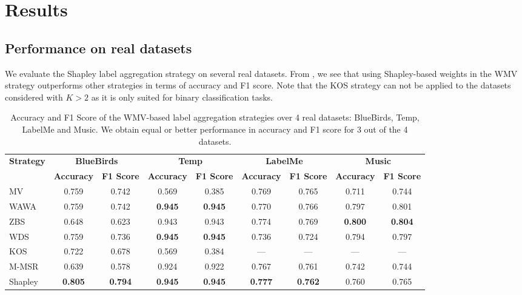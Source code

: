 \documentclass{cap2024}
\begin{document}
\section{Results}
\label{sec:results}
\subsection{Performance on real datasets}

We evaluate the Shapley label aggregation strategy on several real datasets.
From , we see that using Shapley-based weights in the WMV strategy outperforms other strategies in terms of accuracy and F1 score.
Note that the KOS strategy can not be applied to the datasets considered with $K>2$ as it is only suited for binary classification tasks.

\begin{table}[h]
  \centering
  \caption{Accuracy and F1 Score of the WMV-based label aggregation strategies over 4 real datasets: BlueBirds, Temp, LabelMe and Music. We obtain equal or better performance in accuracy and F1 score for 3 out of the 4 datasets.\\ }
  \label{tab:scores}

  \footnotesize{
  \begin{tabular}{l|cc|cc|cc|cc}
  \hline
  \multirow{2}{*}{\textbf{Strategy}} & \multicolumn{2}{c|}{\textbf{BlueBirds}} & \multicolumn{2}{c|}{\textbf{Temp}} & \multicolumn{2}{c|}{\textbf{LabelMe}} & \multicolumn{2}{c}{\textbf{Music}} \\
  \cline{2-9}
   & \textbf{Accuracy} & \textbf{F1 Score} & \textbf{Accuracy} & \textbf{F1 Score} & \textbf{Accuracy} & \textbf{F1 Score} & \textbf{Accuracy} & \textbf{F1 Score} \\
  \hline
  MV    & 0.759 & 0.742 & 0.569 & 0.385 & 0.769 & 0.765 & 0.711 & 0.744 \\
  WAWA  & 0.759 & 0.742 & \textbf{0.945} & \textbf{0.945} & 0.770 & 0.766 & 0.797 & 0.801 \\
  ZBS   & 0.648 & 0.623 & 0.943 & 0.943 & 0.774 & 0.769 & \textbf{0.800} & \textbf{0.804} \\
  WDS   & 0.759 & 0.736 & \textbf{0.945} & \textbf{0.945} & 0.736 & 0.724 & 0.794 & 0.797 \\
  KOS   & 0.722 & 0.678 & 0.569 & 0.384 & --- & --- & --- & --- \\
  M-MSR & 0.639 & 0.578 & 0.924 & 0.922 & 0.767 & 0.761 & 0.742 & 0.744 \\
  \rowcolor{lightgray} Shapley & \textbf{0.805}& \textbf{0.794}& \textbf{0.945} & \textbf{0.945} & \textbf{0.777} & \textbf{0.762} & 0.760 & 0.765  \\

  \hline
  \end{tabular}
  }
  \end{table}
\end{document}
